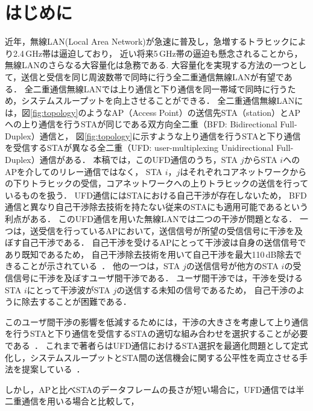 \documentclass[technicalreport]{ieicej}
\begin{document}

\maketitle

\section{はじめに}
	近年，無線LAN(Local Area Network)が急速に普及し，急増するトラヒックにより2.4\,GHz帯は逼迫しており，
	近い将来5\,GHz帯の逼迫も懸念されることから，無線LANのさらなる大容量化は急務である.
	大容量化を実現する方法の一つとして，送信と受信を同じ周波数帯で同時に行う全二重通信無線LANが有望である．
	全二重通信無線LANでは上り通信と下り通信を同一帯域で同時に行うため，システムスループットを向上させることができる．
	全二重通信無線LANには，図\ref{fig:topology}のようなAP（Access Point）の送信先STA（station）とAPへの上り通信を行うSTAが同じである双方向全二重（BFD: Bidirectional Full-Duplex）通信と，
	図\ref{fig:topology}に示すような上り通信を行うSTAと下り通信を受信するSTAが異なる全二重（UFD: user-multiplexing Unidirectional Full-Duplex）通信がある．
	本稿では，このUFD通信のうち，STA $j$からSTA $i$へのAPを介してのリレー通信ではなく，
	STA $i$，$j$はそれぞれコアネットワークからの下りトラヒックの受信，コアネットワークへの上りトラヒックの送信を行っているものを扱う．
	UFD通信にはSTAにおける自己干渉が存在しないため，
	BFD通信と異なり自己干渉除去技術を持たない従来のSTAにも適用可能であるという利点がある．
	このUFD通信を用いた無線LANでは二つの干渉が問題となる．
	一つは，送受信を行っているAPにおいて，送信信号が所望の受信信号に干渉を及ぼす自己干渉である．
	自己干渉を受けるAPにとって干渉波は自身の送信信号であり既知であるため，
	自己干渉除去技術を用いて自己干渉を最大110\,dB除去できることが示されている~\cite{fdmac, stanford1}．
	他の一つは，STA $j$の送信信号が他方のSTA $i$の受信信号に干渉を及ぼすユーザ間干渉である．
	ユーザ間干渉では，干渉を受けるSTA $i$にとって干渉波がSTA $j$の送信する未知の信号であるため，
	自己干渉のように除去することが困難である．
	\par
	このユーザ間干渉の影響を低減するためには，干渉の大きさを考慮して上り通信を行うSTAと下り通信を受信するSTAの適切な組み合わせを選択することが必要である~\cite{promac}．
	これまで著者らはUFD通信におけるSTA選択を最適化問題として定式化し，システムスループットとSTA間の送信機会に関する公平性を両立させる手法を提案している~\cite{promac_fair}．
	\par
	しかし，APと比べSTAのデータフレームの長さが短い場合に，UFD通信では半二重通信を用いる場合と比較して，
\end{document}
